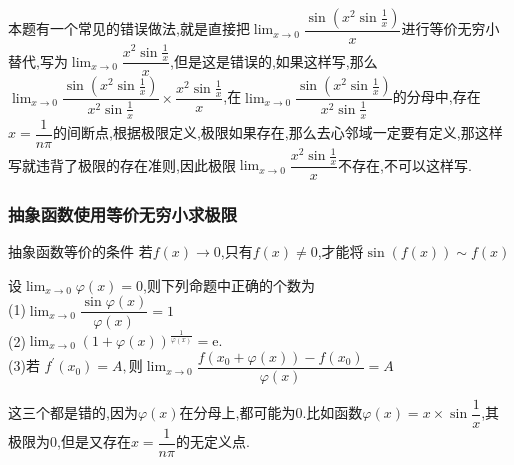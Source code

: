 \documentclass[8pt a4paper, oneside, UTF8]{ctexbook}
\begin{document}
\begin{sloppypar}
\begin{solution}
    \end{solution}
    \begin{note}
        本题有一个常见的错误做法,就是直接把$\lim_{x \to 0}\dfrac{\sin(x^2\sin\frac{1}{x})}{x}$进行等价无穷小替代,写为$\lim_{x \to 0}\dfrac{x^2\sin\frac{1}{x}}{x}$,但是这是错误的,如果这样写,那么$\lim_{x\to0}\dfrac{\sin(x^2\sin\frac{1}{x})}{x^2\sin\frac{1}{x}}\times \dfrac{x^2\sin\frac{1}{x}}{x}$,在$\lim_{x\to0}\dfrac{\sin(x^2\sin\frac{1}{x})}{x^2\sin\frac{1}{x}}$的分母中,存在$x= \dfrac{1}{n\pi}$的间断点,根据极限定义,极限如果存在,那么去心邻域一定要有定义,那这样写就违背了极限的存在准则,因此极限$\lim_{x \to 0}\dfrac{x^2\sin\frac{1}{x}}{x}$不存在,不可以这样写.
    \end{note}
    \subsubsection{抽象函数使用等价无穷小求极限}
    \begin{conclusion}{抽象函数等价的条件}{}
        若$f(x) \to 0$,只有$f(x) \neq 0$,才能将$\sin(f(x))\sim f(x)$
    \end{conclusion}
    \begin{problem}
    设$\lim_{x\to0}\varphi(x)=0$,则下列命题中正确的个数为\\
    (1)$\lim_{x\to0}\dfrac{\sin\varphi(x)}{\varphi(x)}=1$\\
    (2)$\lim_{x\to0}(1+\varphi(x))^{\frac{1}{\varphi(x)}}=\mathrm{e}.$\\
    (3)$\text{若 }f^{\prime}(x_{0})=A,\text{则}\operatorname*{lim}_{x\to0}\dfrac{f(x_{0}+\varphi(x))-f(x_{0})}{\varphi(x)}=A$
    \end{problem}
    \begin{solution}
        这三个都是错的,因为$\varphi(x)$在分母上,都可能为0.比如函数$\varphi(x)=x\times\sin\dfrac{1}{x}$,其极限为0,但是又存在$x=\dfrac{1}{n\pi}$的无定义点.
    \end{solution}

\end{sloppypar}
\end{document}
